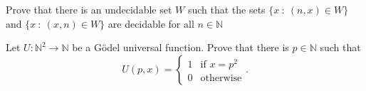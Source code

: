 \documentclass[addpoints]{exam}
\begin{document}
  \pagestyle{headandfoot}
  \runningheadrule

  \firstpagefooter{}{}{}
  \runningfooter{}{}{}
  \begin{flushright}

    \vspace{0.2in}
  \end{flushright}

  \begin{questions}
    \question[10]
      Prove that there is an undecidable set $W$ such that the sets 
			$\{x ~:~ (n, x) \in W\}$ and $\{x ~:~ (x, n) \in W\}$ are decidable for all 
			$n \in \mathbb{N}$

      \begin{solution}[\stretch{1}]
      \end{solution}
      \newpage
    \question[10]
      Let $U : \mathbb{N}^2 \to \mathbb{N}$ be a G\"odel universal function.
			Prove that there is $p \in \mathbb{N}$ such that 
			\[
			  U(p, x) = 
			  \begin{cases}
			    1 & \text{if } x = p^2 \\
			    0 & \text{otherwise}
			  \end{cases}.
			\]

      \begin{solution}[\stretch{1}]
      \end{solution}
      \newpage
  \end{questions}
\end{document}

